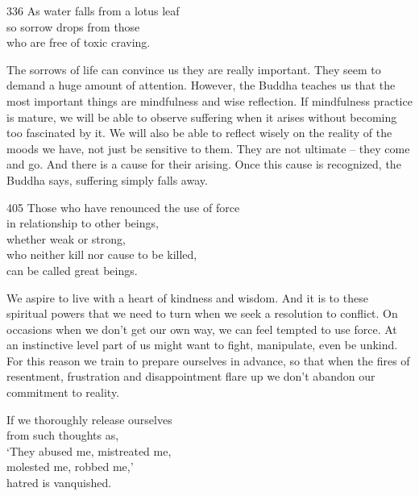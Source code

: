 
\begin{dhpVerse}{336}
\label{dhp-336}
As water falls from a lotus leaf\\
so sorrow drops from those\\
who are free of toxic craving.
\end{dhpVerse}

\begin{dhpRefl}
The sorrows of life can convince us they are really important. They seem to demand a huge amount of attention. However, the Buddha teaches us that the most important things are mindfulness and wise reflection. If mindfulness practice is mature, we will be able to observe suffering when it arises without becoming too fascinated by it. We will also be able to reflect wisely on the reality of the moods we have, not just be sensitive to them. They are not ultimate – they come and go. And there is a cause for their arising. Once this cause is recognized, the Buddha says, suffering simply falls away.
\end{dhpRefl}


\begin{dhpVerse}{405}
\label{dhp-405}
Those who have renounced the use of force\\
in relationship to other beings,\\
whether weak or strong,\\
who neither kill nor cause to be killed,\\
can be called great beings.
\end{dhpVerse}

\begin{dhpRefl}
We aspire to live with a heart of kindness and wisdom. And it is to these spiritual powers that we need to turn when we seek a resolution to conflict. On occasions when we don't get our own way, we can feel tempted to use force. At an instinctive level part of us might want to fight, manipulate, even be unkind. For this reason we train to prepare ourselves in advance, so that when the fires of resentment, frustration and disappointment flare up we don't abandon our commitment to reality.
\end{dhpRefl}


\begin{dhpVerse}{4}
\label{dhp-4}
If we thoroughly release ourselves\\
from such thoughts as,\\
`They abused me, mistreated me,\\
molested me, robbed me,'\\
hatred is vanquished.
\end{dhpVerse}

